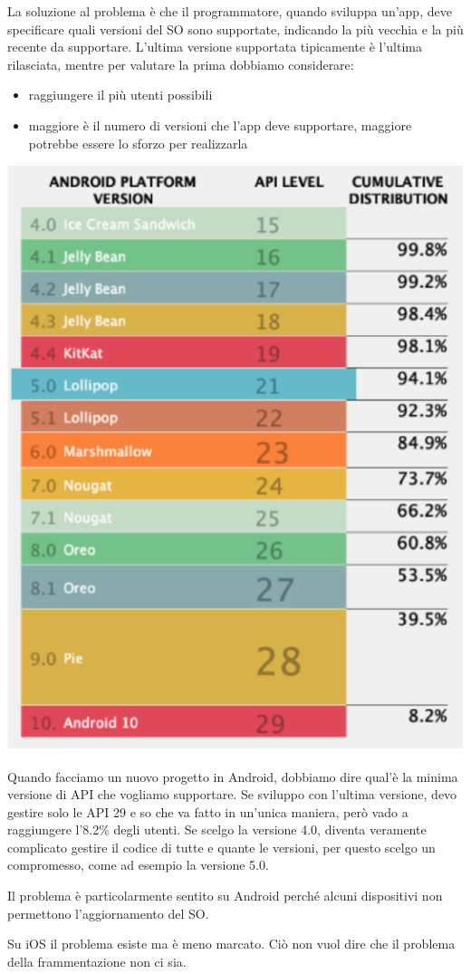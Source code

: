 La soluzione al problema è che il programmatore, quando sviluppa un'app, deve specificare quali versioni del SO sono supportate, indicando la più vecchia e la più recente da supportare. L'ultima versione supportata tipicamente è l'ultima rilasciata, mentre per valutare la prima dobbiamo considerare:
\begin{itemize}
    \item raggiungere il più utenti possibili
    \item maggiore è il numero di versioni che l'app deve supportare, maggiore potrebbe essere lo sforzo per realizzarla 
\end{itemize}
\begin{center}
    \includegraphics[width=.52\textwidth]{images/Mobile computing/2. Sistemi operativi/frammentazione sw.PNG}
\end{center}

Quando facciamo un nuovo progetto in Android, dobbiamo dire qual'è la minima versione di API che vogliamo supportare.
Se sviluppo con l'ultima versione, devo gestire solo le API 29 e so che va fatto in un'unica maniera, però vado a raggiungere l'8.2\% degli utenti.
Se scelgo la versione 4.0, diventa veramente complicato gestire il codice di tutte e quante le versioni, per questo scelgo un compromesso, come ad esempio la versione 5.0. 

Il problema è particolarmente sentito su Android perché alcuni dispositivi non permettono l'aggiornamento del SO. 

Su iOS il problema esiste ma è meno marcato. 
Ciò non vuol dire che il problema della frammentazione non ci sia. 

